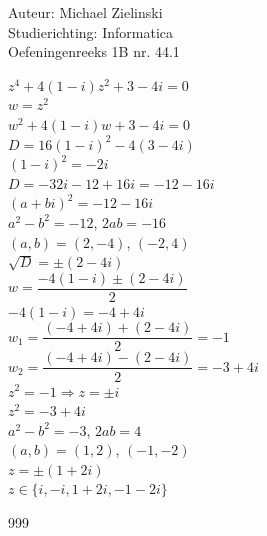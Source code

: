 \documentclass[a4paper]{article}
\begin{document}
\noindent \large Auteur: Michael Zielinski \\
\noindent \large Studierichting: Informatica \\
\noindent \large Oefeningenreeks 1B nr. 44.1 \\

\medskip
\normalsize

$z^4 + 4(1-i)z^2 + 3 - 4i = 0$ \\
  
$w = z^2$ \\
  
$w^2 + 4(1-i)w + 3 - 4i = 0$ \\
  
$D = 16(1-i)^2 - 4(3-4i)$ \\
  
$(1-i)^2 = -2i$ \\
  
$D = -32i - 12 + 16i = -12 - 16i$ \\
  
$(a+bi)^2 = -12 - 16i$ \\
  
$a^2 - b^2 = -12$, $2ab = -16$ \\
  
$(a,b) = (2,-4)$, $(-2,4)$ \\
  
$\sqrt{D} = \pm (2-4i)$ \\
  
$w = \dfrac{-4(1-i) \pm (2-4i)}{2}$ \\
  
$-4(1-i) = -4 + 4i$ \\
  
$w_1 = \dfrac{(-4 + 4i) + (2 - 4i)}{2} = -1$ \\
  
$w_2 = \dfrac{(-4 + 4i) - (2 - 4i)}{2} = -3 + 4i$ \\
  
$z^2 = -1 \Rightarrow z = \pm i$ \\
  
$z^2 = -3 + 4i$ \\
  
$a^2 - b^2 = -3$, $2ab = 4$ \\
  
$(a,b) = (1,2)$, $(-1,-2)$ \\
  
$z = \pm (1 + 2i)$ \\
  
$\boxed{z \in\{ i, -i, 1+2i, -1-2i\}}$ \\

\begin{thebibliography}{999}
\end{thebibliography}
\end{document}
